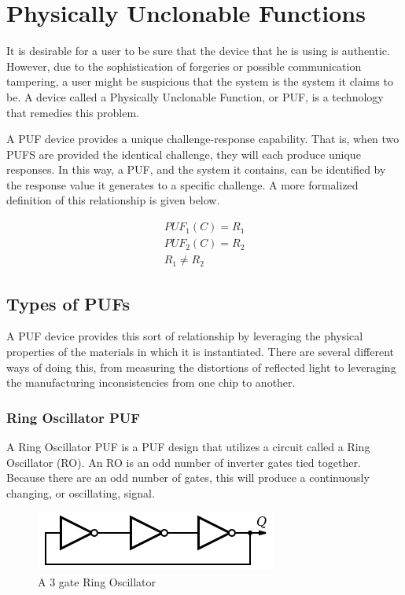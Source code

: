 
\chapter{Physically Unclonable Functions}
\label{chapter:pufoverview}
It is desirable for a user to be sure that the device that he is using is authentic. However, due to the sophistication
of forgeries or possible communication tampering, a user might be suspicious that the system is the system it claims
to be. A device called a Physically Unclonable Function, or PUF, is a technology that remedies this problem.

A PUF device provides a unique challenge-response capability. That is, when two PUFS are provided the identical
challenge, they will each produce unique responses. In this way, a PUF, and the system it contains, 
can be identified by the response value it generates to a specific challenge. A more formalized definition of
this relationship is given below.

\begin{align*}
PUF_1(C) = R_1\\
PUF_2(C) = R_2\\
R_1 \neq R_2
\end{align*}



\section{Types of PUFs}
A PUF device provides this sort of relationship by leveraging the physical properties
of the materials in which it is instantiated. There are several different ways of doing
this, from measuring the distortions of reflected light to leveraging the
manufacturing inconsistencies from one chip to another.

\subsection{Ring Oscillator PUF}
A Ring Oscillator PUF is a PUF design that utilizes a circuit called a Ring 
Oscillator (RO). An RO is an odd number of inverter gates tied together. Because
there are an odd number of gates, this will produce a continuously changing,
or oscillating, signal. 

\begin{figure}[h] %
\includegraphics[]{images/ro.png}
\caption{A 3 gate Ring Oscillator}
\label{fig:ro}
\end{figure}

